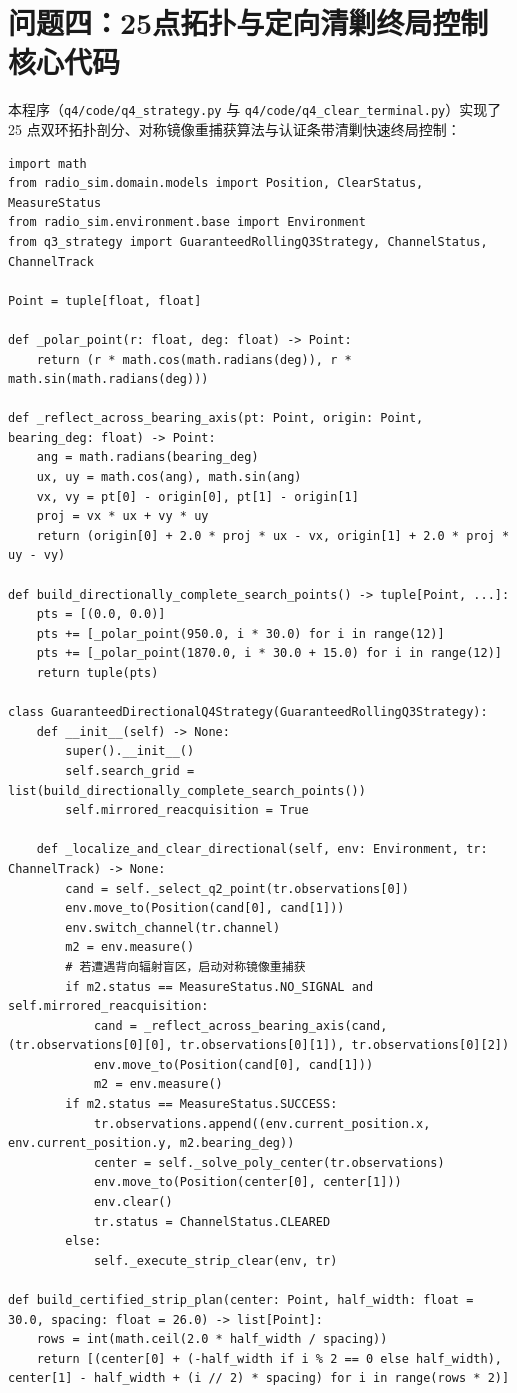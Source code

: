 \section{问题四：25点拓扑与定向清剿终局控制核心代码}
本程序（\texttt{q4/code/q4\_strategy.py} 与 \texttt{q4/code/q4\_clear\_terminal.py}）实现了 25 点双环拓扑剖分、对称镜像重捕获算法与认证条带清剿快速终局控制：

\begin{lstlisting}[caption={问题四核心策略（q4\_strategy.py \& q4\_clear\_terminal.py）}]
import math
from radio_sim.domain.models import Position, ClearStatus, MeasureStatus
from radio_sim.environment.base import Environment
from q3_strategy import GuaranteedRollingQ3Strategy, ChannelStatus, ChannelTrack

Point = tuple[float, float]

def _polar_point(r: float, deg: float) -> Point:
    return (r * math.cos(math.radians(deg)), r * math.sin(math.radians(deg)))

def _reflect_across_bearing_axis(pt: Point, origin: Point, bearing_deg: float) -> Point:
    ang = math.radians(bearing_deg)
    ux, uy = math.cos(ang), math.sin(ang)
    vx, vy = pt[0] - origin[0], pt[1] - origin[1]
    proj = vx * ux + vy * uy
    return (origin[0] + 2.0 * proj * ux - vx, origin[1] + 2.0 * proj * uy - vy)

def build_directionally_complete_search_points() -> tuple[Point, ...]:
    pts = [(0.0, 0.0)]
    pts += [_polar_point(950.0, i * 30.0) for i in range(12)]
    pts += [_polar_point(1870.0, i * 30.0 + 15.0) for i in range(12)]
    return tuple(pts)

class GuaranteedDirectionalQ4Strategy(GuaranteedRollingQ3Strategy):
    def __init__(self) -> None:
        super().__init__()
        self.search_grid = list(build_directionally_complete_search_points())
        self.mirrored_reacquisition = True

    def _localize_and_clear_directional(self, env: Environment, tr: ChannelTrack) -> None:
        cand = self._select_q2_point(tr.observations[0])
        env.move_to(Position(cand[0], cand[1]))
        env.switch_channel(tr.channel)
        m2 = env.measure()
        # 若遭遇背向辐射盲区，启动对称镜像重捕获
        if m2.status == MeasureStatus.NO_SIGNAL and self.mirrored_reacquisition:
            cand = _reflect_across_bearing_axis(cand, (tr.observations[0][0], tr.observations[0][1]), tr.observations[0][2])
            env.move_to(Position(cand[0], cand[1]))
            m2 = env.measure()
        if m2.status == MeasureStatus.SUCCESS:
            tr.observations.append((env.current_position.x, env.current_position.y, m2.bearing_deg))
            center = self._solve_poly_center(tr.observations)
            env.move_to(Position(center[0], center[1]))
            env.clear()
            tr.status = ChannelStatus.CLEARED
        else:
            self._execute_strip_clear(env, tr)

def build_certified_strip_plan(center: Point, half_width: float = 30.0, spacing: float = 26.0) -> list[Point]:
    rows = int(math.ceil(2.0 * half_width / spacing))
    return [(center[0] + (-half_width if i % 2 == 0 else half_width), center[1] - half_width + (i // 2) * spacing) for i in range(rows * 2)]
\end{lstlisting}

